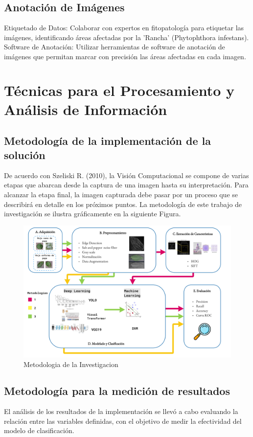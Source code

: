 \subsection{Anotación de Imágenes}
Etiquetado de Datos: Colaborar con expertos en fitopatología para etiquetar las imágenes, identificando áreas afectadas por la 'Rancha' (Phytophthora infestans).
Software de Anotación: Utilizar herramientas de software de anotación de imágenes que permitan marcar con precisión las áreas afectadas en cada imagen.

\section{Técnicas para el Procesamiento y Análisis de Información}
\subsection{Metodología de la implementación de la solución}
De acuerdo con Szeliski R. (2010), la Visión Computacional se compone de varias etapas que abarcan desde la captura de una imagen hasta su interpretación. Para alcanzar la etapa final, la imagen capturada debe pasar por un proceso que se describirá en detalle en los próximos puntos. La metodología de este trabajo de investigación se ilustra gráficamente en la siguiente Figura.
\begin{figure}[H]
	\begin{center}
		\includegraphics[width=1\textwidth]{3/figures/metodologia.jpg}
		\caption{Metodologia de la Investigacion}
		\label{}
	\end{center}
\end{figure}

\subsection{Metodología para la medición de resultados}
El análisis de los resultados de la implementación se llevó a cabo evaluando la relación entre las variables definidas, con el objetivo de medir la efectividad del modelo de clasificación.

